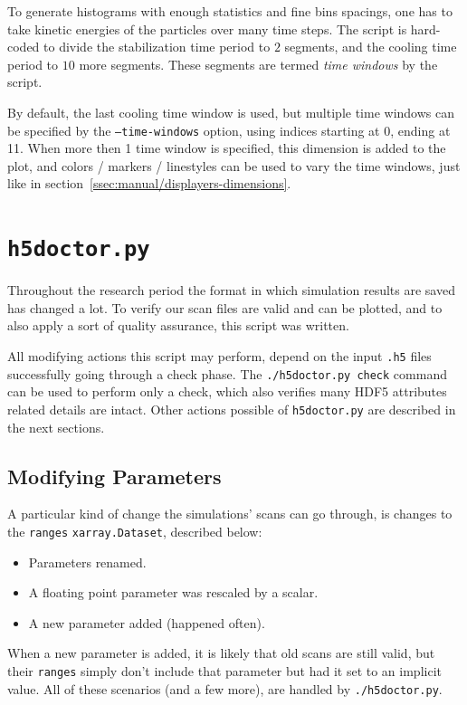 To generate histograms with enough statistics and fine bins spacings, one has to take kinetic energies of the particles over many time steps. The script is hard-coded to divide the stabilization time period to $2$ segments, and the cooling time period to $10$ more segments. These segments are termed \emph{time windows} by the script.

By default, the last cooling time window is used, but multiple time windows can be specified by the \texttt{--time-windows} option, using indices starting at 0, ending at 11. When more then 1 time window is specified, this dimension is added to the plot, and colors / markers / linestyles can be used to vary the time windows, just like in section~\ref{ssec:manual/displayers-dimensions}.

\section{\texttt{h5doctor.py}}

Throughout the research period the format in which simulation results are saved has changed a lot. To verify our scan files are valid and can be plotted, and to also apply a sort of quality assurance, this script was written.

All modifying actions this script may perform, depend on the input \texttt{.h5} files successfully going through a check phase. The \texttt{./h5doctor.py check} command can be used to perform only a check, which also verifies many HDF5 attributes related details are intact. Other actions possible of \texttt{h5doctor.py} are described in the next sections. 

\subsection{Modifying Parameters}

A particular kind of change the simulations' scans can go through, is changes to the \texttt{ranges} \texttt{xarray.Dataset}, described below:

\begin{itemize}
	\item Parameters renamed.
	\item A floating point parameter was rescaled by a scalar.
	\item A new parameter added (happened often).
\end{itemize}

When a new parameter is added, it is likely that old scans are still valid, but their \texttt{ranges} simply don't include that parameter but had it set to an implicit value. All of these scenarios (and a few more), are handled by \texttt{./h5doctor.py}.

